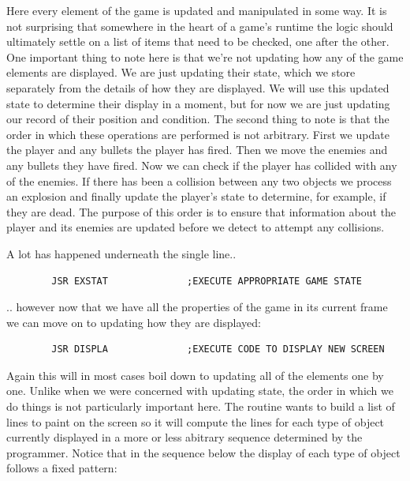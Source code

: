 Here every element of the game is updated and manipulated in some way. It is not surprising that somewhere in the heart of a
game's runtime the logic should ultimately settle on a list of items that need to be checked, one after the other. One important
thing to note here is that we're not updating how any of the game elements are displayed. We are just updating their state, which
we store separately from the details of how they are displayed. We will use this updated state to determine their display in a moment,
but for now we are just updating our record of their position and condition. The second thing to note is that the order in which
these operations are performed is not arbitrary. First we update the player and any bullets the player has fired. Then we move the
enemies and any bullets they have fired. Now we can check if the player has collided with any of the enemies. If there has been a
collision between any two objects we process an explosion and finally update the player's state to determine, for example, if they are dead. The purpose
of this order is to ensure that information about the player and its enemies are updated before we detect to attempt any collisions.

A lot has happened underneath the single line..

\begin{lstlisting}
        JSR EXSTAT              ;EXECUTE APPROPRIATE GAME STATE
\end{lstlisting}

.. however now that we have all the properties of the game in its current frame we can move on to updating how they are displayed:
\begin{lstlisting}
        JSR DISPLA              ;EXECUTE CODE TO DISPLAY NEW SCREEN
\end{lstlisting}

Again this will in most cases boil down to updating all of the elements one by one. Unlike when we were concerned with updating
state, the order in which we do things is not particularly important here. The  routine wants to build a list of lines
to paint on the screen so it will compute the lines for each type of object currently displayed in a more or less abitrary sequence
determined by the programmer. Notice that in the sequence below the display of each type of object follows a fixed pattern:

